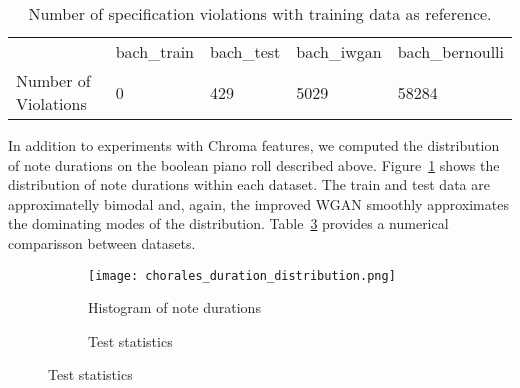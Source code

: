 \begin{table}[!h]
\centering
\begin{tabular}{lllll}
& \cellcolor[HTML]{C0C0C0}bach\_train & \cellcolor[HTML]{C0C0C0}bach\_test & \cellcolor[HTML]{C0C0C0}bach\_iwgan & \cellcolor[HTML]{C0C0C0}bach\_bernoulli \\ \cline{2-5} 
\multicolumn{1}{l|}{\cellcolor[HTML]{C0C0C0}Number of Violations} & 0                                   & 429                                & 5029                                & 58284                                  
\end{tabular}
\caption{Number of specification violations with training data as
    reference.}
\label{tbl:chroma_violations}
\end{table}

In addition to experiments with Chroma features, we computed the distribution of
note durations on the boolean piano roll described above.
Figure~\ref{fig:chorales_duration_distribution} shows the distribution of
note durations within each dataset. The train and test data are approximatelly
bimodal and, again, the improved WGAN smoothly approximates the
dominating modes of the distribution. Table~\ref{tbl:duration} provides a numerical 
comparisson between datasets.


\begin{figure}[!h]
    \begin{subfigure}[b]{0.65\textwidth}
        \texttt{[image: chorales\_duration\_distribution.png]}
        \caption{Histogram of note durations}
        \label{fig:chorales_duration_distribution}
    \end{subfigure}
    \quad
    \begin{subfigure}[b]{0.3\textwidth}
        \caption{Test statistics}
        \label{tbl:duration}
    \end{subfigure}
\end{figure}

